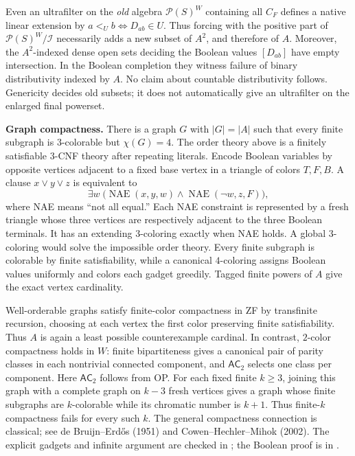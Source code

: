 Even an ultrafilter on the \emph{old} algebra $\mathcal P(S)^W$ containing
all $C_F$ defines a native linear extension by
$a<_U b\Longleftrightarrow D_{ab}\in U$. Thus forcing with the positive
part of $\mathcal P(S)^W/\mathcal I$ necessarily adds a new subset of
$A^2$, and therefore of $A$. Moreover, the $A^2$-indexed dense open
sets deciding the Boolean values $[D_{ab}]$ have empty intersection.
In the Boolean completion they witness failure of binary distributivity
indexed by $A$. No claim about countable distributivity follows.
Genericity decides old subsets; it does not automatically give an
ultrafilter on the enlarged final powerset.

\textbf{Graph compactness.}
There is a graph $G$ with $|G|=|A|$ such that every finite subgraph is
$3$-colorable but $\chi(G)=4$. The order theory above is a finitely
satisfiable $3$-CNF theory after repeating literals. Encode Boolean
variables by opposite vertices adjacent to a fixed base vertex in a
triangle of colors $T,F,B$. A clause $x\vee y\vee z$ is equivalent to
\[
 \exists w\;\bigl(\operatorname{NAE}(x,y,w)
 \wedge\operatorname{NAE}(\neg w,z,F)\bigr),
\]
where NAE means ``not all equal.'' Each NAE constraint is represented
by a fresh triangle whose three vertices are respectively adjacent
to the three Boolean terminals. It has an extending $3$-coloring
exactly when NAE holds. A global $3$-coloring would solve the impossible
order theory. Every finite subgraph is colorable by finite
satisfiability, while a canonical $4$-coloring assigns Boolean values
uniformly and colors each gadget greedily. Tagged finite powers of
$A$ give the exact vertex cardinality.

Well-orderable graphs satisfy finite-color compactness in ZF by
transfinite recursion, choosing at each vertex the first color
preserving finite satisfiability. Thus $A$ is again a least possible
counterexample cardinal. In contrast, $2$-color compactness holds in
$W$: finite bipartiteness gives a canonical pair of parity classes in
each nontrivial connected component, and $\mathsf{AC}_2$ selects one
class per component. Here $\mathsf{AC}_2$ follows from OP.
For each fixed finite $k\geq3$, joining this graph with a complete graph on $k-3$ fresh vertices gives a graph whose finite subgraphs are $k$-colorable while its chromatic number is $k+1$. Thus finite-$k$ compactness fails for every such $k$.
The general compactness connection is classical; see de Bruijn--Erd\H{o}s
(1951) and Cowen--Hechler--Mihok (2002).
The explicit gadgets and infinite argument are checked in
; the Boolean
proof is in
.

